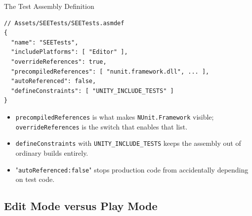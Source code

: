 \begin{frame}[fragile]{The Test Assembly Definition}
  \begin{lstlisting}[language={},basicstyle=\scriptsize\ttfamily]
// Assets/SEETests/SEETests.asmdef
{
  "name": "SEETests",
  "includePlatforms": [ "Editor" ],
  "overrideReferences": true,
  "precompiledReferences": [ "nunit.framework.dll", ... ],
  "autoReferenced": false,
  "defineConstraints": [ "UNITY_INCLUDE_TESTS" ]
}
  \end{lstlisting}
  \vspace{0ex}

  \begin{itemize}
    \item \texttt{precompiledReferences} is what makes \texttt{NUnit.Framework}
      visible; \texttt{overrideReferences} is the switch that enables that list.
    \item \texttt{defineConstraints} with \texttt{UNITY\_INCLUDE\_TESTS} keeps
      the assembly out of ordinary builds entirely.
    \item "\texttt{autoReferenced:false}" stops production code from accidentally
      depending on test code.
  \end{itemize}
  \vspace{0.25ex}

\end{frame}

\subsection{Edit Mode versus Play Mode}

